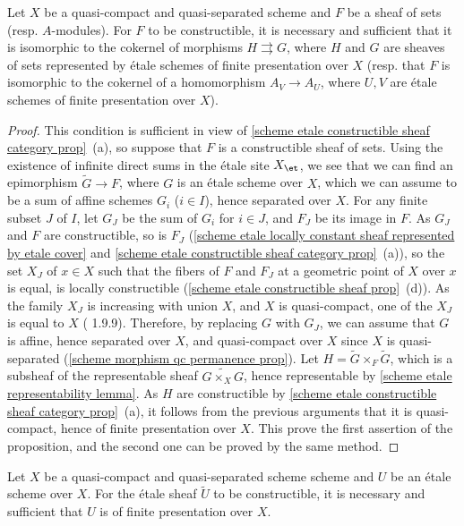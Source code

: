 \begin{proposition}\label{scheme qcqs etale constructible iff cokernel of represented}
Let $X$ be a quasi-compact and quasi-separated scheme and $F$ be a sheaf of sets (resp. $A$-modules). For $F$ to be constructible, it is necessary and sufficient that it is isomorphic to the cokernel of morphisms $H\rightrightarrows G$, where $H$ and $G$ are sheaves of sets represented by \'etale schemes of finite presentation over $X$ (resp. that $F$ is isomorphic to the cokernel of a homomorphism $A_{V}\to A_{U}$, where $U,V$ are \'etale schemes of finite presentation over $X$).
\end{proposition}
\begin{proof}
This condition is sufficient in view of \cref{scheme etale constructible sheaf category prop}~(a), so suppose that $F$ is a constructible sheaf of sets. Using the existence of infinite direct sums in the \'etale site $X_\et$, we see that we can find an epimorphism $\widetilde{G}\to F$, where $G$ is an \'etale scheme over $X$, which we can assume to be a sum of affine schemes $G_i$ ($i\in I$), hence separated over $X$. For any finite subset $J$ of $I$, let $G_J$ be the sum of $G_i$ for $i\in J$, and $F_J$ be its image in $F$. As $G_J$ and $F$ are constructible, so is $F_J$ (\cref{scheme etale locally constant sheaf represented by etale cover} and \cref{scheme etale constructible sheaf category prop}~(a)), so the set $X_J$ of $x\in X$ such that the fibers of $F$ and $F_J$ at a geometric point of $X$ over $x$ is equal, is locally constructible (\cref{scheme etale constructible sheaf prop}~(d)). As the family $X_J$ is increasing with union $X$, and $X$ is quasi-compact, one of the $X_J$ is equal to $X$ (\cite{EGA4} 1.9.9). Therefore, by replacing $G$ with $G_J$, we can assume that $G$ is affine, hence separated over $X$, and quasi-compact over $X$ since $X$ is quasi-separated (\cref{scheme morphism qc permanence prop}). Let $H=\widetilde{G}\times_F\widetilde{G}$, which is a subsheaf of the representable sheaf $\widetilde{G\times_XG}$, hence representable by \cref{scheme etale representability lemma}. As $H$ are constructible by \cref{scheme etale constructible sheaf category prop}~(a), it follows from the previous arguments that it is quasi-compact, hence of finite presentation over $X$. This prove the first assertion of the proposition, and the second one can be proved by the same method.
\end{proof}

\begin{corollary}\label{scheme qcqs etale represented constructible iff fp}
Let $X$ be a quasi-compact and quasi-separated scheme scheme and $U$ be an \'etale scheme over $X$. For the \'etale sheaf $\widetilde{U}$ to be constructible, it is necessary and sufficient that $U$ is of finite presentation over $X$.
\end{corollary}

